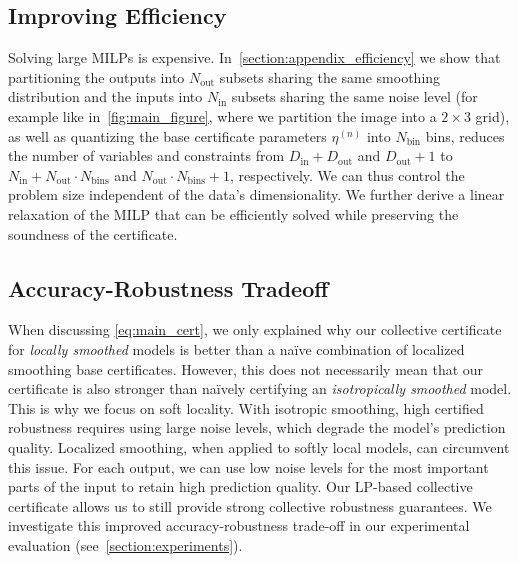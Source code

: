 \documentclass{article} %
\theoremstyle{plain}
\theoremstyle{definition}
\theoremstyle{remark}
\begin{document}
\subsection{Improving Efficiency}
Solving large MILPs is expensive.
In~\autoref{section:appendix_efficiency} we show that partitioning the outputs into $N_\mathrm{out}$ subsets sharing the same smoothing distribution and the inputs into $N_\mathrm{in}$ subsets sharing the same noise level (for example like in~\autoref{fig:main_figure}, where we partition the image into a $2 \times 3$ grid), as well as quantizing the base certificate parameters $\eta^{(n)}$ into $N_\mathrm{bin}$ bins, reduces the number of variables and constraints from $D_\mathrm{in} +  D_\mathrm{out}$ and $D_\mathrm{out} + 1$ to
$N_\mathrm{in} + N_\mathrm{out} \cdot  N_\mathrm{bins}$ and $N_\mathrm{out} \cdot  N_\mathrm{bins} + 1$, respectively.
We can thus control the problem size independent of the data's dimensionality.
We further derive a linear relaxation of the MILP that can be efficiently solved while preserving the soundness of the certificate.

\subsection{Accuracy-Robustness Tradeoff}\label{section:accuracy_robustness_tradeoff}
When discussing \autoref{eq:main_cert}, we only explained why
our collective certificate for \textit{locally smoothed} models is better than a na\"ive combination of localized smoothing base certificates.
However, this does not necessarily mean that our certificate is also stronger than  na\"ively certifying an \textit{isotropically smoothed} model.
This is why we focus on soft locality.
With isotropic smoothing, high certified robustness requires using large noise levels, which degrade the model's prediction quality.
Localized smoothing, when applied to softly local models, can circumvent this issue.
For each output, we can use low noise levels for the most important parts of the input to retain high prediction quality.
Our LP-based collective certificate allows us to still provide strong collective robustness guarantees.
We investigate this improved accuracy-robustness trade-off in our experimental evaluation (see~\autoref{section:experiments}).
\end{document}

